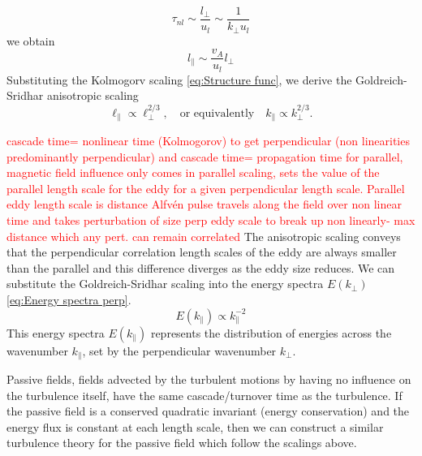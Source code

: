 \begin{equation*}
    \tau_{nl} \sim \frac{l_{\perp}}{u_l} \sim \frac{1}{k_{\perp}u_l} 
\end{equation*}
we obtain 
\begin{equation*}
    l_{\parallel} \sim \frac{v_A}{u_l}l_{\perp}
\end{equation*}
Substituting the Kolmogorv scaling \eqref{eq:Structure func}, we derive  the Goldreich-Sridhar anisotropic scaling 
\begin{equation}
    \ell_{\parallel} \propto \ell_{\perp}^{2/3}, \quad \text{or equivalently} \quad k_{\parallel} \propto k_{\perp}^{2/3}.
    \label{eq:Goldreich Sridhar}
\end{equation}

\textcolor{red}{cascade time= nonlinear time  (Kolmogorov) to get perpendicular (non linearities predominantly perpendicular) and cascade time= propagation time for parallel, magnetic field influence only comes in parallel scaling, sets the value of the parallel length scale for the eddy for a given perpendicular length scale. Parallel eddy length scale is distance Alfv\'en pulse travels along the field over non linear time and takes perturbation of size perp eddy scale to break up non linearly- max distance which any pert. can remain correlated} 
The anisotropic scaling conveys that the perpendicular correlation length scales of the eddy are always smaller than the parallel and this difference diverges as the eddy size reduces. We can substitute the Goldreich-Sridhar scaling into the energy spectra \(E(k_{\perp})\) \eqref{eq:Energy spectra perp}.
\begin{equation*}
   E(k_{\parallel}) \propto k_{\parallel}^{-2} 
\end{equation*}
This energy spectra \(E(k_{\parallel})\) represents the distribution of energies across the wavenumber \(k_{\parallel}\), set by the perpendicular wavenumber \(k_{\perp}\).

Passive fields, fields advected by the turbulent motions by having no influence on the turbulence itself, have the same cascade/turnover time as the turbulence. If the passive field is a conserved quadratic invariant (energy conservation) and the energy flux is constant at each length scale, then we can construct a similar turbulence theory for the passive field which follow the scalings above. 